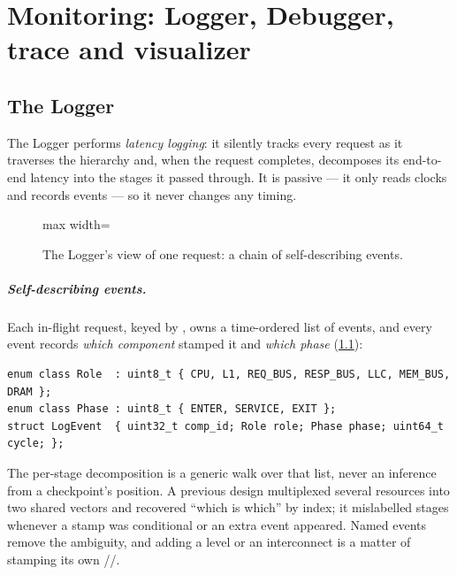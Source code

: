 \chapter[Monitoring]{Monitoring: Logger, Debugger, trace and visualizer}\label{ch:monitoring}


\section{The Logger}

The Logger performs \emph{latency logging}: it silently tracks every request as it traverses
the hierarchy and, when the request completes, decomposes its end-to-end latency into the
stages it passed through. It is passive --- it only reads clocks and records events --- so it
never changes any timing.

\begin{figure}[htbp]\centering
\begin{adjustbox}{max width=\textwidth}\end{adjustbox}
\caption{The Logger's view of one request: a chain of self-describing events.}
\label{fig:stamp-map}
\end{figure}

\paragraph{Self-describing events.} Each in-flight request, keyed by , owns a
time-ordered list of events, and every event records \emph{which component} stamped it and
\emph{which phase} (\cref{fig:stamp-map}):

\begin{lstlisting}[style=cpp]
enum class Role  : uint8_t { CPU, L1, REQ_BUS, RESP_BUS, LLC, MEM_BUS, DRAM };
enum class Phase : uint8_t { ENTER, SERVICE, EXIT };
struct LogEvent  { uint32_t comp_id; Role role; Phase phase; uint64_t cycle; };
\end{lstlisting}

The per-stage decomposition is a generic walk over that list, never an inference from a
checkpoint's position. A previous design multiplexed several resources into two shared vectors
and recovered ``which is which'' by index; it mislabelled stages whenever a stamp was
conditional or an extra event appeared. Named events remove the ambiguity, and adding a level
or an interconnect is a matter of stamping its own //.


